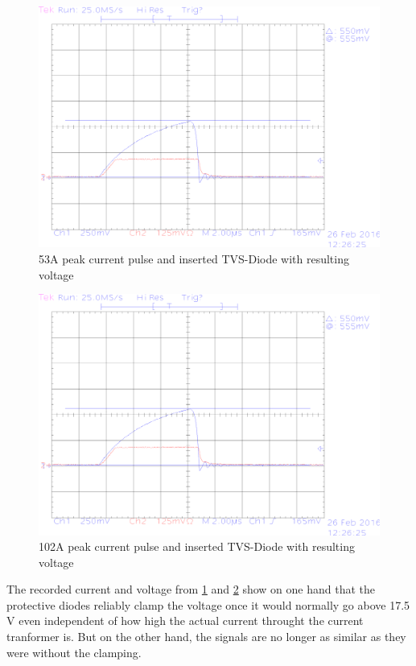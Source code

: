 \begin{figure}[!ht]
	\centering
	\includegraphics[scale=0.3]{figures/Voltage_Clamping/TEK00006.eps}		
	\caption[Kurze Abbildungsbeschreibung]{53A peak current pulse and inserted TVS-Diode with resulting voltage} 
	\label{fig.53Adiode}
\end{figure}

\begin{figure}[!ht]
	\centering
	\includegraphics[scale=0.3]{figures/Voltage_Clamping/TEK00006.eps}		
	\caption[Kurze Abbildungsbeschreibung]{102A peak current pulse and inserted TVS-Diode with resulting voltage} 
	\label{fig.100Adiode}
\end{figure}

The recorded current and voltage from \ref{fig.53Adiode} and \ref{fig.100Adiode} show on
one hand that the protective diodes reliably clamp the voltage once it would normally go above 17.5 V even
independent of how high the actual current throught the current tranformer is. But on the other hand, the signals are no longer as similar as they were 
without the clamping.


